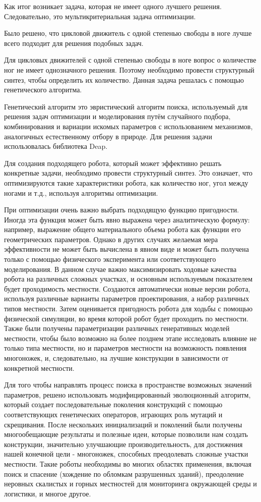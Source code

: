 Как итог возникает задача, которая не имеет одного лучшего решения. Следовательно, это мультикритериальная задача оптимизации.


Было решено, что цикловой движитель с одной степенью свободы в ноге лучше всего подходит для решения подобных задач.

Для цикловых движителей с одной степенью свободы в ноге вопрос о количестве ног не имеет однозначного решения. Поэтому необходимо провести структурный синтез, чтобы определить их количество. Данная задача решалась с помощью генетического алгоритма.

Генетический алгоритм это эвристический алгоритм поиска, используемый для решения задач оптимизации и моделирования путём случайного подбора, комбинирования и вариации искомых параметров с использованием механизмов, аналогичных естественному отбору в природе. Для решения задачи использовалась библиотека Deap.

Для создания подходящего робота, который может эффективно решать конкретные задачи, необходимо провести структурный синтез. Это означает, что оптимизируются такие характеристики робота, как количество ног, угол между ногами и т.д., используя алгоритмы оптимизации.

При оптимизации очень важно выбрать подходящую функцию пригодности. Иногда эта функция может быть явно выражена через аналитическую формулу: например, выражение общего материального объема робота как функции его геометрических параметров. Однако в других случаях желаемая мера эффективности не может быть вычислена в явном виде и может быть получена только с помощью физического эксперимента или соответствующего моделирования. В данном случае важно максимизировать ходовые качества робота на различных сложных участках, и основным используемым показателем будет проходимость местности. Создаются автоматически новые версии робота, используя различные варианты параметров проектирования, а набор различных типов местности. Затем оценивается пригодность робота для ходьбы с помощью физической симуляции, во время которой робот будет проходить по местности. Также были получены параметризации различных генеративных моделей местности, чтобы было возможно на более позднем этапе исследовать влияние не только типа местности, но и параметров местности на возможность появления многоножек, и, следовательно, на лучшие конструкции в зависимости от конкретной местности.

Для того чтобы направлять процесс поиска в пространстве возможных значений параметров, решено использовать модифицированный эволюционный алгоритм, который создает последовательные поколения конструкций с помощью соответствующих генетических операторов, играющих роль мутаций и скрещивания. После нескольких инициализаций и поколений были получены многообещающие результаты и полезные идеи, которые позволили нам создать конструкции, значительно улучшающие производительность, для достижения нашей конечной цели - многоножек, способных преодолевать сложные участки местности. Такие роботы необходимы во многих областях применения, включая поиск и спасение (хождение по обломкам разрушенных зданий), преодоление неровных скалистых и горных местностей для мониторинга окружающей среды и логистики, и многое другое. 

